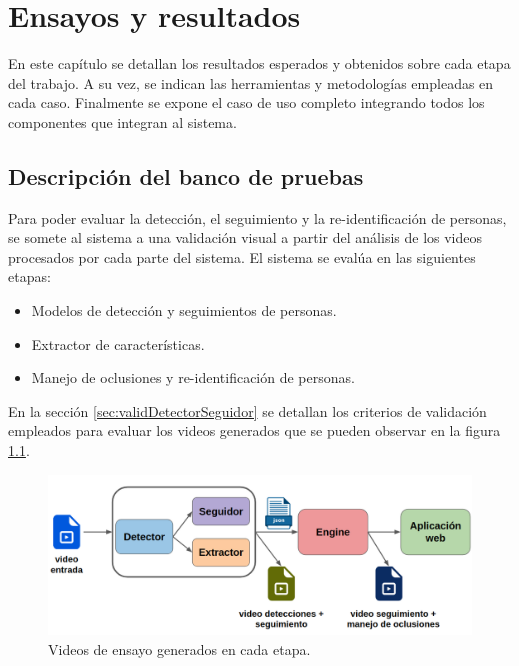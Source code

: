 
\chapter{Ensayos y resultados} %

\label{Chapter4} %

En este capítulo se detallan los resultados esperados y obtenidos sobre cada etapa del trabajo. A su vez, se indican las herramientas y metodologías empleadas en cada caso. Finalmente se expone el caso de uso completo integrando todos los componentes que integran al sistema.


\section{Descripción del banco de pruebas}
\label{sec:bancoPruebas}

Para poder evaluar la detección, el seguimiento y la re-identificación de personas, se somete al sistema a una validación visual a partir del análisis de los videos procesados por cada parte del sistema. El sistema se evalúa en las siguientes etapas:

\begin{itemize}
\item Modelos de detección y seguimientos de personas.
\item Extractor de características.
\item Manejo de oclusiones y re-identificación de personas.
\end{itemize}

En la sección \ref{sec:validDetectorSeguidor} se detallan los criterios de validación empleados para evaluar los videos generados que se pueden observar en la figura \ref{fig:bancoPruebas}.

\begin{figure}[ht]
	\centering
	\includegraphics[scale=.50]{./Figures/bancoPruebas.png}
	\caption{Videos de ensayo generados en cada etapa.}
	\label{fig:bancoPruebas}
\end{figure}



